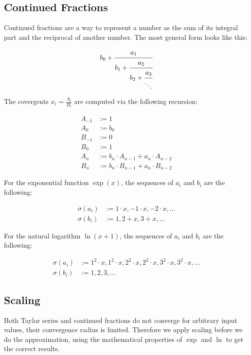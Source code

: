 \documentclass[11pt,a4paper,dvipsnames]{article}
\theoremstyle{definition}
\theoremstyle{definition}
\begin{document}
\subsection{Continued Fractions}
\label{sec:continued-fractions}

Continued fractions are a way to represent a number as the sum of its integral
part and the reciprocal of another number. The most general form looks like
this:

\begin{equation*}
  b_{0} + \cfrac{a_{1}}{b_{1} + \cfrac{a_{2}}{b_{2}  + \cfrac{a_{3}}{\ddots}}}
\end{equation*}

The covergents $x_{i} = \frac{A_{i}}{B_{i}}$ are computed via the following
recursion:

\begin{align*}
  A_{-1} & :=  1 \\
  A_{0} & :=  b_{0} \\
  B_{-1} & :=  0 \\
  B_{0} & := 1 \\
  A_{n} & :=  b_{n}\cdot A_{n-1} + a_{n}\cdot A_{n-2} \\
  B_{n} & :=  b_{n}\cdot B_{n-1} + a_{n}\cdot B_{n-2}
\end{align*}

For the exponential function $\exp(x)$, the sequences of $a_{i}$ and $b_{i}$ are
the following:

\begin{align*}
  \sigma(a_{i}) & := 1 \cdot x, -1 \cdot x, -2 \cdot x, \ldots \\
  \sigma(b_{i}) & := 1, 2 + x, 3 + x, \ldots
\end{align*}

For the natural logarithm $\ln(x+1)$, the sequences of $a_{i}$ and $b_{i}$ are
the following:

\begin{align*}
  \sigma(a_{i}) & := 1^{2}\cdot x, 1^{2}\cdot x, 2^{2}\cdot x, 2^{2}\cdot x, 3^{2}\cdot
          x, 3^{2}\cdot x, \ldots\\
  \sigma(b_{i}) & := 1, 2, 3, \ldots
\end{align*}

\subsection{Scaling}
\label{sec:scaling}

Both Taylor series and continued fractions do not converge for arbitrary input
values, their convergence radius is limited. Therefore we apply scaling before
we do the approximation, using the mathematical properties of $\exp$ and $\ln$
to get the correct results.
\end{document}
